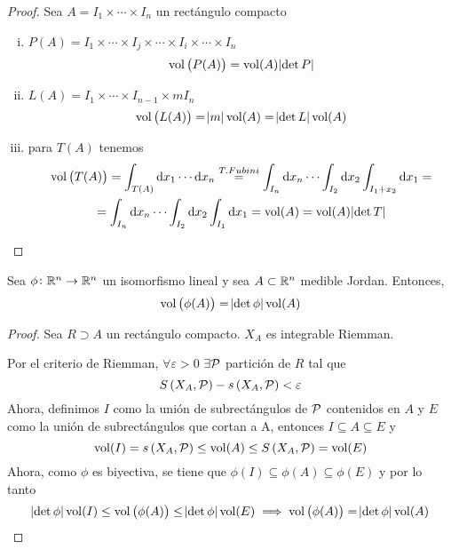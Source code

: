 \begin{proof}
    Sea $A = I_1 \times \cdots \times I_n$ un rectángulo compacto
    \begin{enumerate}[i)]
        \item $P(A) = I_1 \times \cdots \times I_j \times \cdots \times I_i \times \cdots \times I_n$
            \[
                \operatorname{vol}\left( P(A) \right) = \operatorname{vol}(A) \abs{\det P}
            \]
        \item $L(A) = I_1 \times \cdots \times I_{n-1} \times mI_n$
            \[
                \operatorname{vol}\left( L(A) \right) = \abs{m} \operatorname{vol}(A) = \abs{\det L} \operatorname{vol}(A)
            \]
        \item para $T(A)$ tenemos
            \begin{gather*}
                \vol\left( T(A) \right) = \int_{T(A)} \dif x_1 \cdots \dif x_n \stackrel{T.Fubini}{=}
                \int_{I_n} \dif x_n \cdots \int_{I_2} \dif x_2 \int_{I_1 + x_2} \dif x_1 = \\ =
                \int_{I_n} \dif x_n \cdots \int_{I_2} \dif x_2 \int_{I_1} \dif x_1 = \vol(A) = \vol(A) \abs{\det T}
            \end{gather*} 
    \end{enumerate}
\end{proof}

\begin{lema*}[2]\label{lema:dos_cambio}
    Sea $\phi \colon \mathbb{R}^n \to \mathbb{R}^n$ un isomorfismo lineal y sea $A \subset \mathbb{R}^n$ medible Jordan.
    Entonces,
    \[
        \operatorname{vol}\left( \phi(A) \right) = \abs{\det \phi} \operatorname{vol}(A)
    \]
\end{lema*}

\begin{proof}
    Sea $R \supset A$ un rectángulo compacto. $X_A$ es integrable Riemman.

    Por el criterio de Riemman, $\forall \varepsilon > 0$ $\exists \mathcal{P}$ partición de $R$ tal que
    \[
        S\left( X_A, \mathcal{P} \right) - s\left( X_A, \mathcal{P} \right) < \varepsilon
    \]
    Ahora, definimos $I$ como la unión de subrectángulos de $\mathcal{P}$ contenidos en $A$ y $E$ como la unión de subrectángulos
    que cortan a A, entonces $I \subseteq A \subseteq E$ y
    \[
        \operatorname{vol}(I) = s\left( X_A, \mathcal{P} \right) \leq \operatorname{vol}(A) \leq S\left( X_A, \mathcal{P} \right) = \operatorname{vol}(E)
    \]
    Ahora, como $\phi$ es biyectiva, se tiene que $\phi(I) \subseteq \phi(A) \subseteq \phi(E)$ y por lo tanto
    \[
        \abs{\det\phi} \operatorname{vol}(I) \leq \operatorname{vol}\left( \phi(A) \right) \leq \abs{\det\phi} \operatorname{vol}(E) \implies
        \operatorname{vol}\left( \phi(A) \right) = \abs{\det \phi} \operatorname{vol}(A)
    \]
\end{proof}

